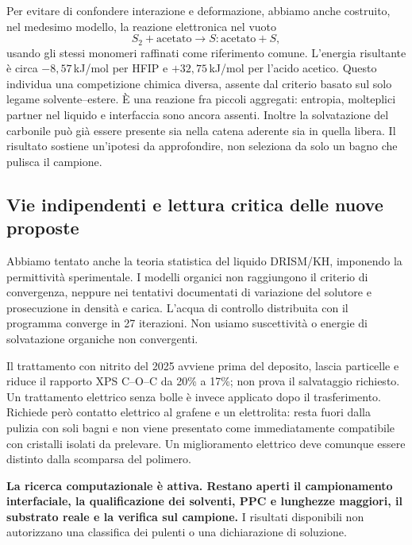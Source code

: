 \documentclass[11pt,reqno]{amsart}
\numberwithin{equation}{section}
\begin{document}
Per evitare di confondere interazione e deformazione,
abbiamo anche costruito, nel medesimo modello, la reazione
elettronica nel vuoto
\begin{equation}
 S_2+\mathrm{acetato}\longrightarrow S\!:\!\mathrm{acetato}+S,
\end{equation}
usando gli stessi monomeri raffinati come riferimento comune.
L'energia risultante \`e circa $-8,57$\,kJ/mol per HFIP e
$+32,75$\,kJ/mol per l'acido acetico. Questo individua una
competizione chimica diversa, assente dal criterio basato sul
solo legame solvente--estere. \`E una reazione fra piccoli
aggregati: entropia, molteplici partner nel liquido e interfaccia
sono ancora assenti. Inoltre la solvatazione del carbonile
pu\`o gi\`a essere presente sia nella catena aderente sia in
quella libera. Il risultato sostiene un'ipotesi da approfondire,
non seleziona da solo un bagno che pulisca il campione.

\subsection{Vie indipendenti e lettura critica delle nuove proposte}

Abbiamo tentato anche la teoria statistica del liquido DRISM/KH,
imponendo la permittivit\`a sperimentale. I modelli organici
non raggiungono il criterio di convergenza, neppure nei tentativi
documentati di variazione del solutore e prosecuzione in densit\`a
e carica. L'acqua di controllo distribuita con il programma
converge in 27 iterazioni. Non usiamo suscettivit\`a o energie
di solvatazione organiche non convergenti.

Il trattamento con nitrito del 2025 \cite{LeeNitrite2025} avviene
prima del deposito, lascia particelle e riduce il rapporto XPS
C--O--C da 20\% a 17\%; non prova il salvataggio richiesto.
Un trattamento elettrico senza bolle \cite{Park2018} \`e invece
applicato dopo il trasferimento. Richiede per\`o contatto elettrico
al grafene e un elettrolita: resta fuori dalla pulizia con soli bagni
e non viene presentato come immediatamente compatibile con
cristalli isolati da prelevare. Un miglioramento elettrico deve
comunque essere distinto dalla scomparsa del polimero.

\textbf{La ricerca computazionale \`e attiva. Restano aperti il
campionamento interfaciale, la qualificazione dei solventi,
PPC e lunghezze maggiori, il substrato reale e la verifica sul campione.}
I risultati disponibili non autorizzano una classifica dei pulenti
o una dichiarazione di soluzione.
\end{document}
